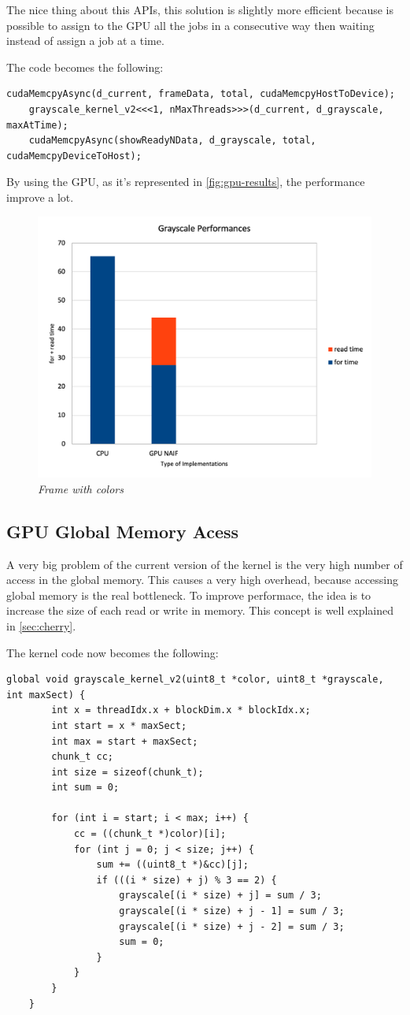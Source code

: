 \documentclass[paper=a4, fontsize=10pt]{scrartcl}	%
\begin{document}
	The nice thing about this APIs, this solution is slightly more efficient because is possible to assign to the GPU all the jobs in a consecutive way then waiting instead of assign a job at a time.

	The code becomes the following:

	\begin{lstlisting}[style=CStyle]
	cudaMemcpyAsync(d_current, frameData, total, cudaMemcpyHostToDevice);
	grayscale_kernel_v2<<<1, nMaxThreads>>>(d_current, d_grayscale, maxAtTime);
	cudaMemcpyAsync(showReadyNData, d_grayscale, total, cudaMemcpyDeviceToHost);
	\end{lstlisting}

	By using the GPU, as it's represented in \autoref{fig:gpu-results}, the performance improve a lot. 

	\begin{figure}[H]
		\centering
		\includegraphics[width=0.65\linewidth]{images/bw/Picture 2.png}
		\caption{\textit{Frame with colors}}
		\label{fig:gpu-results}
	\end{figure}


	\subsection{GPU Global Memory Acess }

	A very big problem of the current version of the kernel is the very high number of access in the global memory. This causes a very high overhead, because accessing global memory is the real bottleneck. 
	To improve performace, the idea is to increase the size of each read or write in memory. 
	This concept is well explained in \autoref{sec:cherry}.

	The kernel code now becomes the following:

	\begin{lstlisting}[style=CStyle]
	global void grayscale_kernel_v2(uint8_t *color, uint8_t *grayscale, int maxSect) {
		int x = threadIdx.x + blockDim.x * blockIdx.x;
		int start = x * maxSect;
		int max = start + maxSect;
		chunk_t cc;
		int size = sizeof(chunk_t);
		int sum = 0;
	
		for (int i = start; i < max; i++) {
			cc = ((chunk_t *)color)[i];
			for (int j = 0; j < size; j++) {
				sum += ((uint8_t *)&cc)[j];
				if (((i * size) + j) % 3 == 2) {
					grayscale[(i * size) + j] = sum / 3;
					grayscale[(i * size) + j - 1] = sum / 3;
					grayscale[(i * size) + j - 2] = sum / 3;
					sum = 0;
				}
			}
		}
	}
	\end{lstlisting}
\end{document}
